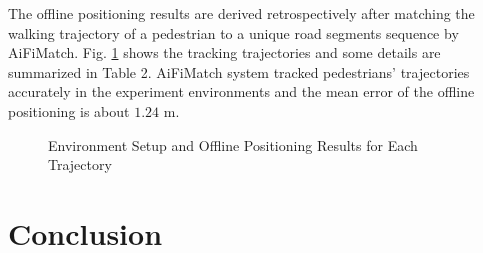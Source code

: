 \documentclass[conference]{IEEEtran}
\begin{document}
The offline positioning results are derived retrospectively after matching the walking trajectory of a pedestrian to a unique road segments sequence by AiFiMatch. Fig. \ref{fig-envandoffline} shows the tracking trajectories and some details are summarized in Table 2. AiFiMatch system tracked pedestrians' trajectories accurately in the experiment environments and the mean error of the offline positioning is about $1.24$ m.

\begin{figure}[!ht]
	\centering
	\vfil
	\vfil
	\caption{ Environment Setup and Offline Positioning Results for Each Trajectory}
	\label{fig-envandoffline}
\end{figure}



\section{Conclusion}
\end{document}
